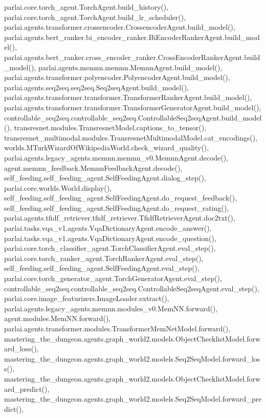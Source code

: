 parlai.\+core.\+torch\+\_\+agent.\+Torch\+Agent.\+build\+\_\+history(), parlai.\+core.\+torch\+\_\+agent.\+Torch\+Agent.\+build\+\_\+lr\+\_\+scheduler(), parlai.\+agents.\+transformer.\+crossencoder.\+Crossencoder\+Agent.\+build\+\_\+model(), parlai.\+agents.\+bert\+\_\+ranker.\+bi\+\_\+encoder\+\_\+ranker.\+Bi\+Encoder\+Ranker\+Agent.\+build\+\_\+model(), parlai.\+agents.\+bert\+\_\+ranker.\+cross\+\_\+encoder\+\_\+ranker.\+Cross\+Encoder\+Ranker\+Agent.\+build\+\_\+model(), parlai.\+agents.\+memnn.\+memnn.\+Memnn\+Agent.\+build\+\_\+model(), parlai.\+agents.\+transformer.\+polyencoder.\+Polyencoder\+Agent.\+build\+\_\+model(), parlai.\+agents.\+seq2seq.\+seq2seq.\+Seq2seq\+Agent.\+build\+\_\+model(), parlai.\+agents.\+transformer.\+transformer.\+Transformer\+Ranker\+Agent.\+build\+\_\+model(), parlai.\+agents.\+transformer.\+transformer.\+Transformer\+Generator\+Agent.\+build\+\_\+model(), controllable\+\_\+seq2seq.\+controllable\+\_\+seq2seq.\+Controllable\+Seq2seq\+Agent.\+build\+\_\+model(), transresnet.\+modules.\+Transresnet\+Model.\+captions\+\_\+to\+\_\+tensor(), transresnet\+\_\+multimodal.\+modules.\+Transresnet\+Multimodal\+Model.\+cat\+\_\+encodings(), worlds.\+M\+Turk\+Wizard\+Of\+Wikipedia\+World.\+check\+\_\+wizard\+\_\+quality(), parlai.\+agents.\+legacy\+\_\+agents.\+memnn.\+memnn\+\_\+v0.\+Memnn\+Agent.\+decode(), agent.\+memnn\+\_\+feedback.\+Memnn\+Feedback\+Agent.\+decode(), self\+\_\+feeding.\+self\+\_\+feeding\+\_\+agent.\+Self\+Feeding\+Agent.\+dialog\+\_\+step(), parlai.\+core.\+worlds.\+World.\+display(), self\+\_\+feeding.\+self\+\_\+feeding\+\_\+agent.\+Self\+Feeding\+Agent.\+do\+\_\+request\+\_\+feedback(), self\+\_\+feeding.\+self\+\_\+feeding\+\_\+agent.\+Self\+Feeding\+Agent.\+do\+\_\+request\+\_\+rating(), parlai.\+agents.\+tfidf\+\_\+retriever.\+tfidf\+\_\+retriever.\+Tfidf\+Retriever\+Agent.\+doc2txt(), parlai.\+tasks.\+vqa\+\_\+v1.\+agents.\+Vqa\+Dictionary\+Agent.\+encode\+\_\+answer(), parlai.\+tasks.\+vqa\+\_\+v1.\+agents.\+Vqa\+Dictionary\+Agent.\+encode\+\_\+question(), parlai.\+core.\+torch\+\_\+classifier\+\_\+agent.\+Torch\+Classifier\+Agent.\+eval\+\_\+step(), parlai.\+core.\+torch\+\_\+ranker\+\_\+agent.\+Torch\+Ranker\+Agent.\+eval\+\_\+step(), self\+\_\+feeding.\+self\+\_\+feeding\+\_\+agent.\+Self\+Feeding\+Agent.\+eval\+\_\+step(), parlai.\+core.\+torch\+\_\+generator\+\_\+agent.\+Torch\+Generator\+Agent.\+eval\+\_\+step(), controllable\+\_\+seq2seq.\+controllable\+\_\+seq2seq.\+Controllable\+Seq2seq\+Agent.\+eval\+\_\+step(), parlai.\+core.\+image\+\_\+featurizers.\+Image\+Loader.\+extract(), parlai.\+agents.\+legacy\+\_\+agents.\+memnn.\+modules\+\_\+v0.\+Mem\+N\+N.\+forward(), agent.\+modules.\+Mem\+N\+N.\+forward(), parlai.\+agents.\+transformer.\+modules.\+Transformer\+Mem\+Net\+Model.\+forward(), mastering\+\_\+the\+\_\+dungeon.\+agents.\+graph\+\_\+world2.\+models.\+Object\+Checklist\+Model.\+forward\+\_\+loss(), mastering\+\_\+the\+\_\+dungeon.\+agents.\+graph\+\_\+world2.\+models.\+Seq2\+Seq\+Model.\+forward\+\_\+loss(), mastering\+\_\+the\+\_\+dungeon.\+agents.\+graph\+\_\+world2.\+models.\+Object\+Checklist\+Model.\+forward\+\_\+predict(), mastering\+\_\+the\+\_\+dungeon.\+agents.\+graph\+\_\+world2.\+models.\+Seq2\+Seq\+Model.\+forward\+\_\+predict(), 